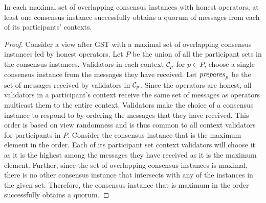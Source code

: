\begin{lemma}\label{lem:prepareOverlap}
    In each maximal set of overlapping consensus instances with honest operators, at least one consensus instance successfully obtains a quorum of  messages from each of its participants' contexts. 
\end{lemma}
\begin{proof}
    Consider a view after GST with a maximal set of overlapping consensus instances led by honest operators. 
    Let $P$ be the union of all the participant sets in the consensus instances. 
    Validators in each context $\mathcal{C}_p$ for $p\in P$, choose a single consensus instance from the  messages they have received. 
    Let $\mathit{prepares}_p$ be the set of  messages received by validators in $\mathcal{C}_p$.
    Since the operators are honest, all validators in a participant's context receive the same set of  messages as operators multicast them to the entire context. 
    Validators make the choice of a consensus instance to respond to by ordering the  messages that they have received. 
    This order is based on view randomness and is thus common to all context validators for participants in $P$. 
    Consider the consensus instance that is the maximum element in the order. 
    Each of its participant set context validators will choose it as it is the highest among the  messages they have received as it is the maximum element. 
    Further, since the set of overlapping consensus instances is maximal, there is no other consensus instance that intersects with any of the instances in the given set. 
    Therefore, the consensus instance that is maximum in the order successfully obtains a quorum.
\end{proof}



